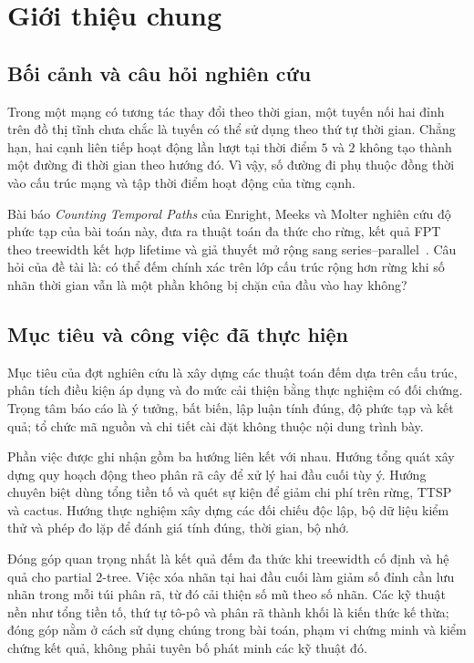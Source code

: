 \chapter{Giới thiệu chung}
\label{report:body:start}

\section{Bối cảnh và câu hỏi nghiên cứu}

Trong một mạng có tương tác thay đổi theo thời gian, một tuyến nối hai đỉnh trên đồ thị tĩnh chưa chắc là tuyến có thể sử dụng theo thứ tự thời gian. Chẳng hạn, hai cạnh liên tiếp hoạt động lần lượt tại thời điểm $5$ và $2$ không tạo thành một đường đi thời gian theo hướng đó. Vì vậy, số đường đi phụ thuộc đồng thời vào cấu trúc mạng và tập thời điểm hoạt động của từng cạnh.

Bài báo \textit{Counting Temporal Paths} của Enright, Meeks và Molter nghiên cứu độ phức tạp của bài toán này, đưa ra thuật toán đa thức cho rừng, kết quả FPT theo treewidth kết hợp lifetime và giả thuyết mở rộng sang series--parallel~\cite{enright2025}. Câu hỏi của đề tài là: có thể đếm chính xác trên lớp cấu trúc rộng hơn rừng khi số nhãn thời gian vẫn là một phần không bị chặn của đầu vào hay không?

\section{Mục tiêu và công việc đã thực hiện}

Mục tiêu của đợt nghiên cứu là xây dựng các thuật toán đếm dựa trên cấu trúc, phân tích điều kiện áp dụng và đo mức cải thiện bằng thực nghiệm có đối chứng. Trọng tâm báo cáo là ý tưởng, bất biến, lập luận tính đúng, độ phức tạp và kết quả; tổ chức mã nguồn và chi tiết cài đặt không thuộc nội dung trình bày.

Phần việc được ghi nhận gồm ba hướng liên kết với nhau. Hướng tổng quát xây dựng quy hoạch động theo phân rã cây để xử lý hai đầu cuối tùy ý. Hướng chuyên biệt dùng tổng tiền tố và quét sự kiện để giảm chi phí trên rừng, TTSP và cactus. Hướng thực nghiệm xây dựng các đối chiếu độc lập, bộ dữ liệu kiểm thử và phép đo lặp để đánh giá tính đúng, thời gian, bộ nhớ.

Đóng góp quan trọng nhất là kết quả đếm đa thức khi treewidth cố định và hệ quả cho partial 2-tree. Việc xóa nhãn tại hai đầu cuối làm giảm số đỉnh cần lưu nhãn trong mỗi túi phân rã, từ đó cải thiện số mũ theo số nhãn. Các kỹ thuật nền như tổng tiền tố, thứ tự tô-pô và phân rã thành khối là kiến thức kế thừa; đóng góp nằm ở cách sử dụng chúng trong bài toán, phạm vi chứng minh và kiểm chứng kết quả, không phải tuyên bố phát minh các kỹ thuật đó.
